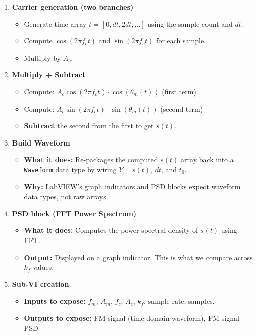 \documentclass[../../main.tex]{subfiles}
\begin{document}
\begin{enumerate}[leftmargin=2em]
\item \textbf{Carrier generation (two branches)}
  \begin{itemize}[leftmargin=1.5em]
    \item Generate time array $t = [0, dt, 2dt, \ldots]$ using the sample count and $dt$.
    \item Compute $\cos(2\pi f_c t)$ and $\sin(2\pi f_c t)$ for each sample.
    \item Multiply by $A_c$.
  \end{itemize}

\item \textbf{Multiply + Subtract}
  \begin{itemize}[leftmargin=1.5em]
    \item Compute: $A_c \cos(2\pi f_c t) \cdot \cos(\theta_m(t))$ (first term)
    \item Compute: $A_c \sin(2\pi f_c t) \cdot \sin(\theta_m(t))$ (second term)
    \item \textbf{Subtract} the second from the first to get $s(t)$.
  \end{itemize}

\item \textbf{Build Waveform}
  \begin{itemize}[leftmargin=1.5em]
    \item \textbf{What it does:} Re-packages the computed $s(t)$ array back into a \texttt{Waveform} data type by wiring $Y = s(t)$, $dt$, and $t_0$.
    \item \textbf{Why:} LabVIEW's graph indicators and PSD blocks expect waveform data types, not raw arrays.
  \end{itemize}

\item \textbf{PSD block (FFT Power Spectrum)}
  \begin{itemize}[leftmargin=1.5em]
    \item \textbf{What it does:} Computes the power spectral density of $s(t)$ using FFT.
    \item \textbf{Output:} Displayed on a graph indicator. This is what we compare across $k_f$ values.
  \end{itemize}

\item \textbf{Sub-VI creation}
  \begin{itemize}[leftmargin=1.5em]
    \item \textbf{Inputs to expose:} $f_m$, $A_m$, $f_c$, $A_c$, $k_f$, sample rate, samples.
    \item \textbf{Outputs to expose:} FM signal (time domain waveform), FM signal PSD.
  \end{itemize}

\end{enumerate}
\end{document}
